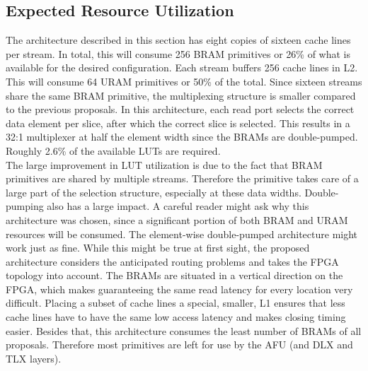 \subsection{Expected Resource Utilization}
The architecture described in this section has eight copies of sixteen cache lines per stream. In total, this will consume 256 BRAM primitives or 26\% of what is available for the desired configuration. Each stream buffers 256 cache lines in L2. This will consume 64 URAM primitives or 50\% of the total. Since sixteen streams share the same BRAM primitive, the multiplexing structure is smaller compared to the previous proposals. In this architecture, each read port selects the correct data element per slice, after which the correct slice is selected. This results in a 32:1 multiplexer at half the element width since the BRAMs are double-pumped. Roughly 2.6\% of the available LUTs are required.\\
The large improvement in LUT utilization is due to the fact that BRAM primitives are shared by multiple streams. Therefore the primitive takes care of a large part of the selection structure, especially at these data widths. Double-pumping also has a large impact. A careful reader might ask why this architecture was chosen, since a significant portion of both BRAM and URAM resources will be consumed. The element-wise double-pumped architecture might work just as fine. While this might be true at first sight, the proposed architecture considers the anticipated routing problems and takes the FPGA topology into account. The BRAMs are situated in a vertical direction on the FPGA, which makes guaranteeing the same read latency for every location very difficult. Placing a subset of cache lines a special, smaller, L1 ensures that less cache lines have to have the same low access latency and makes closing timing easier. Besides that, this architecture consumes the least number of BRAMs of all proposals. Therefore most primitives are left for use by the AFU (and DLX and TLX layers).






